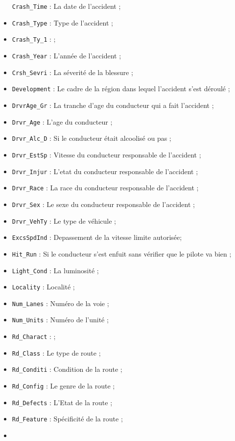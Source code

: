\documentclass[
  french,
]{article}
\begin{document}
\begin{itemize}
  \texttt{Crash\_Time} : La date de l'accident ;
\item
  \texttt{Crash\_Type} : Type de l'accident ;
\item
  \texttt{Crash\_Ty\_1} : ;
\item
  \texttt{Crash\_Year} : L'année de l'accident ;
\item
  \texttt{Crsh\_Sevri} : La séverité de la blessure ;
\item
  \texttt{Development} : Le cadre de la région dans lequel l'accident
  s'est déroulé ;
\item
  \texttt{DrvrAge\_Gr} : La tranche d'age du conducteur qui a fait
  l'accident ;
\item
  \texttt{Drvr\_Age} : L'age du conducteur ;
\item
  \texttt{Drvr\_Alc\_D} : Si le conducteur était alcoolisé ou pas ;
\item
  \texttt{Drvr\_EstSp} : Vitesse du conducteur responsable de l'accident
  ;
\item
  \texttt{Drvr\_Injur} : L'etat du conducteur responsable de l'accident
  ;
\item
  \texttt{Drvr\_Race} : La race du conducteur responsable de l'accident
  ;
\item
  \texttt{Drvr\_Sex} : Le sexe du conducteur responsable de l'accident ;
\item
  \texttt{Drvr\_VehTy} : Le type de véhicule ;
\item
  \texttt{ExcsSpdInd} : Depassement de la vitesse limite autorisée;
\item
  \texttt{Hit\_Run} : Si le conducteur s'est enfuit sans vérifier que le
  pilote va bien ;
\item
  \texttt{Light\_Cond} : La luminosité ;
\item
  \texttt{Locality} : Localité ;
\item
  \texttt{Num\_Lanes} : Numéro de la voie ;
\item
  \texttt{Num\_Units} : Numéro de l'unité ;
\item
  \texttt{Rd\_Charact} : ;
\item
  \texttt{Rd\_Class} : Le type de route ;
\item
  \texttt{Rd\_Conditi} : Condition de la route ;
\item
  \texttt{Rd\_Config} : Le genre de la route ;
\item
  \texttt{Rd\_Defects} : L'Etat de la route ;
\item
  \texttt{Rd\_Feature} : Spécificité de la route ;
\item

\end{itemize}
\end{document}
